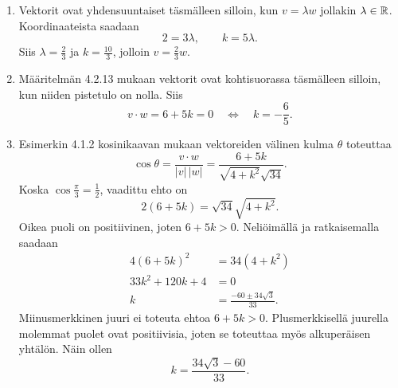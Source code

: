 \documentclass[11pt,a4paper]{amsart}
\begin{document}
\begin{solution}
  \leavevmode\par
  \begin{enumerate}[label=(\alph*), leftmargin=*]
    \item Vektorit ovat yhdensuuntaiset täsmälleen silloin, kun
      \(v=\lambda w\) jollakin \(\lambda\in\mathbb{R}\). Koordinaateista saadaan
      \[
        2=3\lambda,\qquad k=5\lambda.
      \]
      Siis \(\lambda=\frac23\) ja \(k=\frac{10}{3}\), jolloin
      \(v=\frac23w\).

    \item Määritelmän 4.2.13 mukaan vektorit ovat kohtisuorassa
      täsmälleen silloin, kun niiden pistetulo on nolla. Siis
      \[
        v\cdot w=6+5k=0
        \quad\Longleftrightarrow\quad k=-\frac65.
      \]

    \item Esimerkin 4.1.2 kosinikaavan mukaan vektoreiden välinen
      kulma \(\theta\) toteuttaa
      \[
        \cos\theta=\frac{v\cdot w}{|v|\,|w|}
        =\frac{6+5k}{\sqrt{4+k^2}\sqrt{34}}.
      \]
      Koska \(\cos\frac\pi3=\frac12\), vaadittu ehto on
      \[
        2(6+5k)=\sqrt{34}\sqrt{4+k^2}.
      \]
      Oikea puoli on positiivinen, joten \(6+5k>0\).
      Neliöimällä ja ratkaisemalla saadaan
      \[
        \begin{aligned}
          4(6+5k)^2&=34(4+k^2) \\
          33k^2+120k+4&=0 \\[0.5ex]
          k&=\frac{-60\pm34\sqrt3}{33}.
        \end{aligned}
      \]
      Miinusmerkkinen juuri ei toteuta ehtoa \(6+5k>0\).
      Plusmerkkisellä juurella molemmat puolet ovat positiivisia,
      joten se toteuttaa myös alkuperäisen yhtälön. Näin ollen
      \[
        k=\frac{34\sqrt3-60}{33}.
      \]
  \end{enumerate}


\end{solution}
\end{document}
